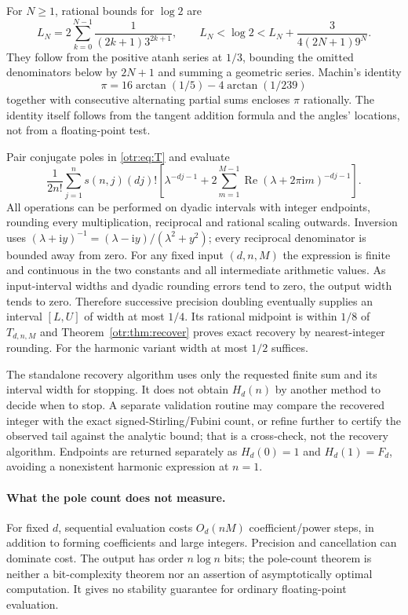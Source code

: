 \documentclass[11pt,a4paper]{article}
\theoremstyle{definition}\newtheorem{definition}[theorem]{Definition}
\theoremstyle{remark}\newtheorem{remark}[theorem]{Remark}
\newcommand{\lam}{\lambda}
\newcommand{\ii}{\mathrm i}
\newcommand{\Rea}{\operatorname{Re}}
\begin{document}
For $N\ge1$, rational bounds for $\log2$ are
\begin{equation}\label{otr:eq:logbounds}
 L_N=2\sum_{k=0}^{N-1}\frac1{(2k+1)3^{2k+1}},\qquad
 L_N<\log2<L_N+\frac3{4(2N+1)9^N}.
\end{equation}
They follow from the positive atanh series at $1/3$, bounding the omitted denominators below by $2N+1$ and summing a geometric series. Machin's identity
\[
 \pi=16\arctan(1/5)-4\arctan(1/239)
\]
together with consecutive alternating partial sums encloses $\pi$ rationally. The identity itself follows from the tangent addition formula and the angles' locations, not from a floating-point test.

Pair conjugate poles in \eqref{otr:eq:T} and evaluate
\begin{equation}\label{otr:eq:paired}
 \frac1{2n!}\sum_{j=1}^{n}s(n,j)(dj)!
 \left[\lam^{-dj-1}+2\sum_{m=1}^{M-1}
                    \Rea(\lam+2\pi\ii m)^{-dj-1}\right].
\end{equation}
All operations can be performed on dyadic intervals with integer endpoints, rounding every multiplication, reciprocal and rational scaling outwards. Inversion uses
$(\lam+\ii y)^{-1}=(\lam-\ii y)/(\lam^2+y^2)$; every reciprocal denominator is bounded away from zero. For any fixed input $(d,n,M)$ the expression is finite and continuous in the two constants and all intermediate arithmetic values. As input-interval widths and dyadic rounding errors tend to zero, the output width tends to zero. Therefore successive precision doubling eventually supplies an interval $[L,U]$ of width at most $1/4$. Its rational midpoint is within $1/8$ of $T_{d,n,M}$ and Theorem~\ref{otr:thm:recover} proves exact recovery by nearest-integer rounding. For the harmonic variant width at most $1/2$ suffices.

The standalone recovery algorithm uses only the requested finite sum and its interval width for stopping. It does not obtain $H_d(n)$ by another method to decide when to stop. A separate validation routine may compare the recovered integer with the exact signed-Stirling/Fubini count, or refine further to certify the observed tail against the analytic bound; that is a cross-check, not the recovery algorithm. Endpoints are returned separately as $H_d(0)=1$ and $H_d(1)=F_d$, avoiding a nonexistent harmonic expression at $n=1$.

\paragraph{What the pole count does not measure.}
For fixed $d$, sequential evaluation costs $O_d(nM)$ coefficient/power steps, in addition to forming coefficients and large integers. Precision and cancellation can dominate cost. The output has order $n\log n$ bits; the pole-count theorem is neither a bit-complexity theorem nor an assertion of asymptotically optimal computation. It gives no stability guarantee for ordinary floating-point evaluation.
\end{document}

